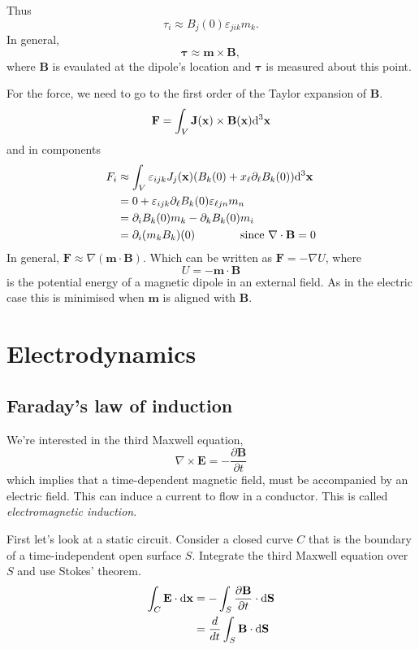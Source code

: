 \documentclass{article}
\begin{document}
Thus
\[
	\tau_i \approx B_j(0)\varepsilon_{jik}m_k.
\]
In general,
\[
  \boldsymbol \tau \approx \mathbf m \times \mathbf B,
\]
where $ \mathbf B $ is evaulated at the dipole's location and $ \boldsymbol \tau $ is measured about this point.
\par
For the force, we need to go to the first order of the Taylor expansion of $ \mathbf B $.
\[
  \mathbf F = \int_V \mathbf J(\mathbf{x}) \times\mathbf B(\mathbf{x})\mathrm d^3 \mathbf{x}
\]
and in components
\begin{align*}
	F_i &\approx \int_V \varepsilon_{ijk} J_j(\mathbf{x})(B_k(0) + x_\ell \partial_\ell B_k(0))\mathrm d^3 \mathbf{x}\\
	    &= 0 + \varepsilon_{ijk} \partial_\ell B_k(0)\varepsilon_{\ell jn}m_n\\
	    &= \partial_i B_k(0) m_k - \partial_k B_k(0)m_i\\
	    &= \partial_i(m_kB_k)(0)\qquad\qquad \text{since } \nabla\cdot\mathbf B = 0\\
\end{align*}
In general, $ \mathbf F \approx \nabla(\mathbf m \cdot\mathbf B) $. Which can be written as $ \mathbf F = - \nabla U $, where
\[
  U = -\mathbf m \cdot\mathbf B
\]
is the potential energy of a magnetic dipole in an external field. As in the electric case this is minimised when $ \mathbf m $ is aligned with $ \mathbf B $.
\section{Electrodynamics}
\subsection{Faraday's law of induction}
We're interested in the third Maxwell equation,
\[
	\nabla\times\mathbf E = - \frac{\partial \mathbf B}{\partial t}
\]
which implies that a time-dependent magnetic field, must be accompanied by an electric field. This can induce a current to flow in a conductor. This is called \textit{electromagnetic induction}.
\par
First let's look at a static circuit. Consider a closed curve $ C $ that is the boundary of a time-independent open surface $ S $. Integrate the third Maxwell equation over $ S $ and use Stokes' theorem.
\begin{align*}
	\int_C \mathbf E\cdot\mathrm d\mathbf{x} &= -\int_S \frac{\partial \mathbf B}{\partial t}\cdot\mathrm d \mathbf S \\
					 &= \frac d{dt} \int_S \mathbf B\cdot\mathrm d\mathbf S
\end{align*}
\end{document}
